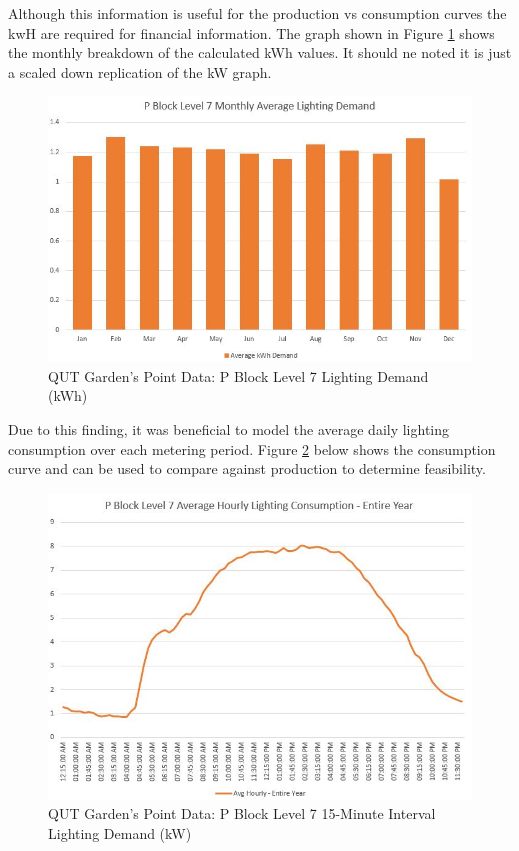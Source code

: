 Although this information is useful for the production vs consumption curves the kwH are required for financial information. The graph shown in Figure \ref{fig:pblock-lvl7-monthly-kwh} shows the monthly breakdown of the calculated kWh values. It should ne noted it is just a scaled down replication of the kW graph.    

\begin{figure}[H]
	\hfill\includegraphics[width = 150mm]{images/metering/pme/pblock-lvl7-monthly-kwh}\hspace*{\fill}
	\caption{QUT Garden's Point Data: P Block Level 7 Lighting Demand (kWh)} 
	\label{fig:pblock-lvl7-monthly-kwh}
\end{figure} 

Due to this finding, it was beneficial to model the average daily lighting consumption over each metering period. Figure \ref{fig:pblock-lvl7-15-minute} below shows the consumption curve and can be used to compare against production to determine feasibility.  

\begin{figure}[H]
	\hfill\includegraphics[width = 150mm]{images/metering/pme/pblock-lvl7-daily-avg-kw}\hspace*{\fill}
	\caption{QUT Garden's Point Data: P Block Level 7 15-Minute Interval Lighting Demand (kW)} 
	\label{fig:pblock-lvl7-15-minute}
\end{figure}

